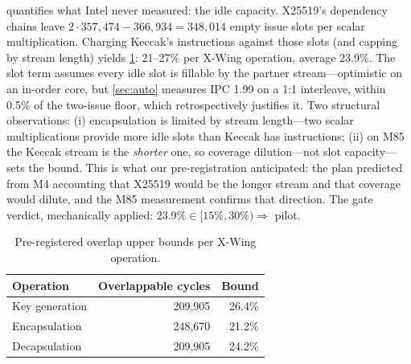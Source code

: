 \documentclass[11pt,a4paper]{article}
\newcommand{\xwing}{X-Wing}\newcommand{\slothy}{SLOTHY}\newcommand{\keccak}{Keccak-f1600}
\begin{document}
 quantifies what Intel never measured: the idle capacity.
X25519's dependency chains leave $2{\cdot}357{,}474-366{,}934 = 348{,}014$
empty issue slots per scalar multiplication. Charging Keccak's instructions
against those slots (and capping by stream length) yields \cref{tab:bound}:
21--27\% per \xwing{} operation, average 23.9\%. The slot term assumes every
idle slot is fillable by the partner stream---optimistic on an in-order core,
but \cref{sec:auto} measures IPC 1.99 on a 1:1 interleave, within 0.5\% of the
two-issue floor, which retrospectively justifies it. Two structural observations:
(i) encapsulation is limited by stream length---two scalar multiplications
provide more idle slots than Keccak has instructions; (ii) on M85 the Keccak
stream is the \emph{shorter} one, so coverage dilution---not slot capacity---sets
the bound. This is what our pre-registration anticipated: the plan predicted from
M4 accounting \cite{Sim26} that X25519 would be the longer stream and that
coverage would dilute, and the M85 measurement confirms that direction. The
gate verdict, mechanically applied: $23.9\% \in [15\%,30\%) \Rightarrow$
pilot.

\begin{table}[t]\centering
\caption{Pre-registered overlap upper bounds per \xwing{} operation.}
\label{tab:bound}
\begin{tabular}{lrr}\toprule
Operation & Overlappable cycles & Bound\\\midrule
Key generation & 209,905 & 26.4\%\\
Encapsulation & 248,670 & 21.2\%\\
Decapsulation & 209,905 & 24.2\%\\\bottomrule
\end{tabular}\end{table}
\end{document}
